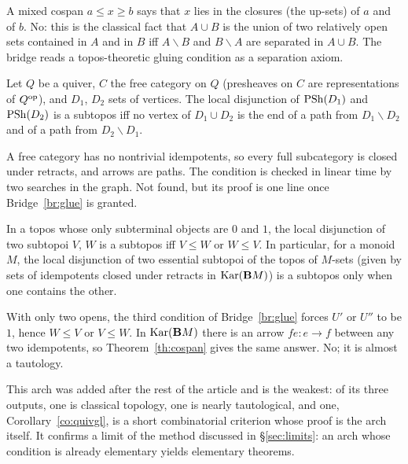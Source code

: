 \noindent A mixed cospan $a\le x\ge b$ says that $x$ lies in the closures (the up-sets) of $a$ and of $b$. \status{} No: this is the classical fact that $A\cup B$ is the union of two relatively open sets contained in $A$ and in $B$ iff $A\smallsetminus B$ and $B\smallsetminus A$ are separated in $A\cup B$. The bridge reads a topos-theoretic gluing condition as a separation axiom.

\begin{corollary}[Quivers]\label{co:quivgl}
Let $Q$ be a quiver, $C$ the free category on $Q$ (presheaves on $C$ are representations of $Q^{\mathrm{op}}$), and $D_1$, $D_2$ sets of vertices. The local disjunction of $\mathrm{PSh}(D_1)$ and $\mathrm{PSh}(D_2)$ is a subtopos iff no vertex of $D_1\cup D_2$ is the end of a path from $D_1\smallsetminus D_2$ and of a path from $D_2\smallsetminus D_1$.
\end{corollary}

\noindent A free category has no nontrivial idempotents, so every full subcategory is closed under retracts, and arrows are paths. The condition is checked in linear time by two searches in the graph. \status{} Not found, but its proof is one line once Bridge~\ref{br:glue} is granted.

\begin{corollary}\label{co:twovalued}
In a topos whose only subterminal objects are $0$ and $1$, the local disjunction of two subtopoi $V$, $W$ is a subtopos iff $V\le W$ or $W\le V$. In particular, for a monoid $M$, the local disjunction of two essential subtopoi of the topos of $M$-sets (given by sets of idempotents closed under retracts in $\operatorname{Kar}(\mathbf{B} M)$) is a subtopos only when one contains the other.
\end{corollary}

\noindent With only two opens, the third condition of Bridge~\ref{br:glue} forces $U'$ or $U''$ to be $1$, hence $W\le V$ or $V\le W$. In $\operatorname{Kar}(\mathbf{B} M)$ there is an arrow $fe\colon e\to f$ between any two idempotents, so Theorem~\ref{th:cospan} gives the same answer. \status{} No; it is almost a tautology.

\begin{remark}
This arch was added after the rest of the article and is the weakest: of its three outputs, one is classical topology, one is nearly tautological, and one, Corollary~\ref{co:quivgl}, is a short combinatorial criterion whose proof is the arch itself. It confirms a limit of the method discussed in \S\ref{sec:limits}: an arch whose condition is already elementary yields elementary theorems.
\end{remark}
